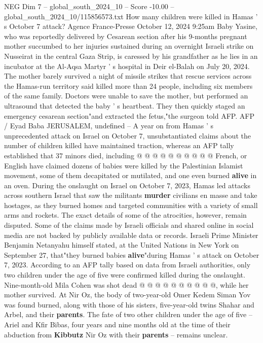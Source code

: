 \begin{textsample}{NEG Dim 7 – global\_south\_2024\_10 – Score -10.00 – global\_south\_2024\_10/115856573.txt}  \label{ex:f7_neg_241}
How many children were killed in Hamas ' s October 7 attack?
Agence France-Presse October 12, 2024 9:25am Baby Yasine, who was reportedly delivered by Cesarean section after his 9-months pregnant mother succumbed to her injuries sustained during an overnight Israeli strike on Nusseirat in the central Gaza Strip, is caressed by his grandfather as he lies in an incubator at the Al-Aqsa Martyr ' s hospital in Deir el-Balah on July 20, 2024.
The mother barely survived a night of missile strikes that rescue services across the Hamas-run territory said killed more than 24 people, including six members of the same family.
Doctors were unable to save the mother, but performed an ultrasound that detected the baby ' s heartbeat.
They then quickly staged an emergency cesarean section"and extracted the fetus,"the surgeon told AFP.
AFP / Eyad Baba JERUSALEM, undefined -- A year on from Hamas ' s unprecedented attack on Israel on October 7, unsubstantiated claims about the number of children killed have maintained traction, whereas an AFP tally established that 37 minors died, including @ @ @ @ @ @ @ @ @ @ French, or English have claimed dozens of babies were killed by the Palestinian Islamist movement, some of them decapitated or mutilated, and one even burned \textbf{alive} in an oven.
During the onslaught on Israel on October 7, 2023, Hamas led attacks across southern Israel that saw the militants \textbf{murder} civilians en masse and take hostages, as they burned homes and targeted communities with a variety of small arms and rockets.
The exact details of some of the atrocities, however, remain disputed.
Some of the claims made by Israeli officials and shared online in social media are not backed by publicly available data or records.
Israeli Prime Minister Benjamin Netanyahu himself stated, at the United Nations in New York on September 27, that"they burned babies \textbf{alive}"during Hamas ' s attack on October 7, 2023.
According to an AFP tally based on data from Israeli authorities, only two children under the age of five were confirmed killed during the onslaught.
Nine-month-old Mila Cohen was shot dead @ @ @ @ @ @ @ @ @ @, while her mother survived.
At Nir Oz, the body of two-year-old Omer Kedem Siman Yov was found burned, along with those of his sisters, five-year-old twins Shahar and Arbel, and their \textbf{parents}.
The fate of two other children under the age of five -- Ariel and Kfir Bibas, four years and nine months old at the time of their abduction from \textbf{Kibbutz} Nir Oz with their \textbf{parents} -- remains unclear.

\end{textsample}
